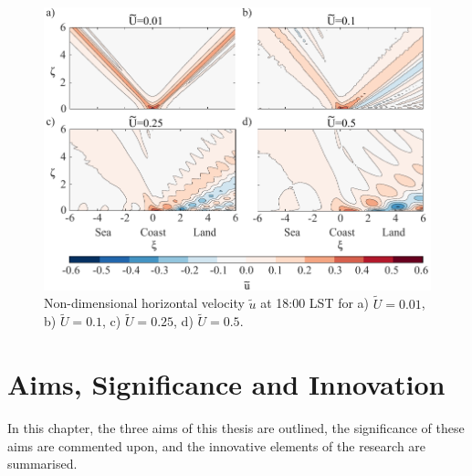 \documentclass[12pt]{book}
\begin{document}
\begin{figure}
\begin{center}
\includegraphics{qianOne.pdf}
\caption{Non-dimensional horizontal velocity $\widetilde{u}$ at 18:00 LST for a) $\widetilde{U}=0.01$,  b) $\widetilde{U}=0.1$, c) $\widetilde{U}=0.25$, d) $\widetilde{U}=0.5$.}
\label{Fig:QianOne}
\end{center}
\end{figure}



\chapter{Aims, Significance and Innovation}
\label{Ch:Aims}

In this chapter, the three aims of this thesis are outlined, the significance of these aims are commented upon, and the innovative elements of the research are summarised.   
\end{document}
